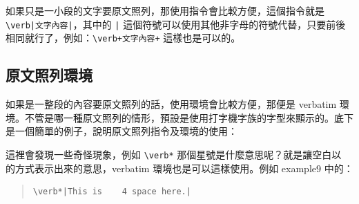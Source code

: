 如果只是一小段的文字要原文照列，那使用指令會比較方便，這個指令就是 \verb+\verb|文字內容|+，其中的 \verb+|+ 這個符號可以使用其他非字母的符號代替，只要前後相同就行了，例如：\verb|\verb+文字內容+| 這樣也是可以的。

\subsection{原文照列環境}

如果是一整段的內容要原文照列的話，使用環境會比較方便，那便是 {\ttfamily verbatim} 環境。不管是哪一種原文照列的情形，預設是使用打字機字族的字型來顯示的。底下是一個簡單的例子，說明原文照列指令及環境的使用：


% 
% 

這裡會發現一些奇怪現象，例如
\texttt{\textbackslash{}verb*}
那個星號是什麼意思呢？就是讓空白以 \verb*| | 的方式表示出來的意思，{\ttfamily verbatim} 環境也是可以這樣使用。例如 {\ttfamily example9} 中的：

\begin{quote}
   \begin{verbatim}
\verb*|This is    4 space here.|
\end{verbatim}
\end{quote}

